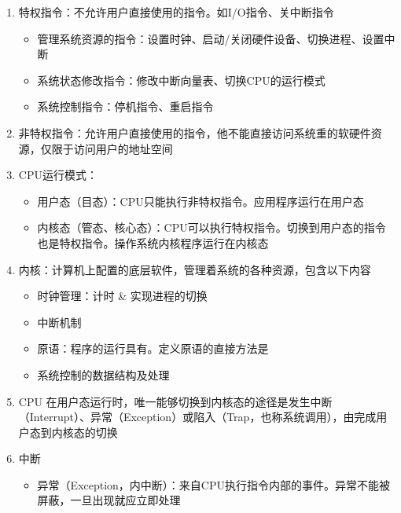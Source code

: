 \documentclass[./operating-systems.tex]{subfiles}
\begin{document}
    \begin{enumerate}
        \item 特权指令：不允许用户直接使用的指令。如I/O指令、关中断指令
        \begin{itemize}
            \item 管理系统资源的指令：设置时钟、启动/关闭硬件设备、切换进程、设置中断
            \item 系统状态修改指令：修改中断向量表、切换CPU的运行模式
            \item 系统控制指令：停机指令、重启指令
        \end{itemize}
        \item 非特权指令：允许用户直接使用的指令，他不能直接访问系统重的软硬件资源，仅限于访问用户的地址空间
        \item CPU运行模式：
        \begin{itemize}
            \item 用户态（目态）：CPU只能执行非特权指令。应用程序运行在用户态
            \item 内核态（管态、核心态）：CPU可以执行特权指令。切换到用户态的指令也是特权指令。操作系统内核程序运行在内核态
        \end{itemize}
        \item 内核：计算机上配置的底层软件，管理着系统的各种资源，包含以下内容
        \begin{itemize}
            \item 时钟管理：计时 \& 实现进程的切换
            \item 中断机制
            \item 原语：程序的运行具有{\color{red}{原子性}}。定义原语的直接方法是{\color{customgreen}{关中断}}
            \item 系统控制的数据结构及处理
        \end{itemize}
        \item CPU 在用户态运行时，唯一能够切换到内核态的途径是发生中断（Interrupt）、异常（Exception）或陷入（Trap，也称系统调用），由{\color{red}{硬件}}完成用户态到内核态的切换
        \item 中断
        \begin{itemize}
            \item 异常（Exception，内中断）：来自CPU执行指令内部的事件。异常不能被屏蔽，一旦出现就应立即处理
\end{itemize}
\end{enumerate}
\end{document}

